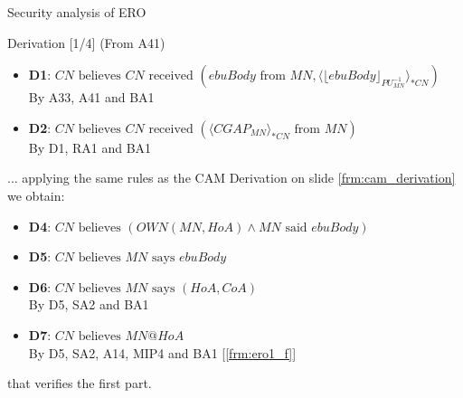 \documentclass[10pt]{beamer}
\newcommand{\xtext}[1]{\text{ #1 }}
\begin{document}
\begin{frame}{Security analysis of ERO}
	\begin{block}{Derivation [1/4]}
		\label{frm:ero1_s}
		\small
		(From A41)
		\vspace{-0.2cm}
		\begin{itemize}
			\item \textbf{D1}: {\small $CN \xtext{believes} CN \xtext{received} (ebuBody \xtext{from} MN, \langle \lfloor ebuBody\rfloor_{PU_{MN}^{-1}}\rangle_{*CN})$ \\ \hspace{1.7cm} By A33, A41 and BA1}
			\item \textbf{D2}: $CN \xtext{believes} CN \xtext{received} (\langle CGAP_{MN}\rangle_{*CN} \xtext{from} MN)$ \\ \hspace{1.7cm} By D1, RA1 and BA1
		\end{itemize}
		... applying the same rules as the CAM Derivation on slide \ref{frm:cam_derivation} we obtain:
		\begin{itemize}
			\item \textbf{D4}: $CN \xtext{believes} (OWN(MN,HoA) \land MN \xtext{said} ebuBody)$
			\item \textbf{D5}: $CN \xtext{believes} MN \xtext{says} ebuBody$
			\item \textbf{D6}: $CN \xtext{believes} MN \xtext{says} (HoA, CoA)$ \\ \hspace{1.7cm} By D5, SA2 and BA1
			\item \textbf{D7}: $CN \xtext{believes} MN@HoA$ \\ \hspace{1.7cm} By D5, SA2, A14, MIP4 and BA1 [\underline{\ref{frm:ero1_f}}]
		\end{itemize}
		\vspace{-0.2cm}
		that verifies the first part.
	\end{block}
\end{frame}
\end{document}

